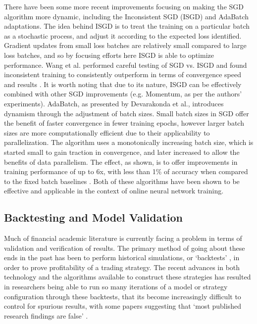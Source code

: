 \documentclass[a4paper,11pt,oneside]{article}
\theoremstyle{plain}
\theoremstyle{definition}
\begin{document}
There have been some more recent improvements focusing on making the SGD algorithm more dynamic, 
including the Inconsistent SGD (ISGD) and AdaBatch adaptations. The idea behind ISGD is to treat the training 
on a particular batch as a stochastic process, and adjust it according to the expected loss identified. Gradient 
updates from small loss batches are relatively small compared to large loss batches, and so by focusing efforts 
here ISGD is able to optimize performance. Wang et al. performed careful testing of SGD vs. ISGD and found 
inconsistent training to consistently outperform in terms of convergence speed and results \cite{Wang}. It is worth 
noting that due to its nature, ISGD can be effectively combined with other SGD improvements (e.g. Momentum, 
as per the authors’ experiments). AdaBatch, as presented by Devarakonda et al., introduces dynamism through 
the adjustment of batch sizes. Small batch sizes in SGD offer the benefit of faster convergence in fewer training 
epochs, however larger batch sizes are more computationally efficient due to their applicability to parallelization. 
The algorithm uses a monotonically increasing batch size, which is started small to gain traction in convergence, 
and later increased to allow the benefits of data parallelism. The effect, as shown, is to offer improvements in 
training performance of up to 6x, with less than 1\% of accuracy when compared to the fixed batch baselines \cite{Devarakonda}. 
Both of these algorithms have been shown to be effective and applicable in the context of online neural network training.
\hfill\break

\subsection{Backtesting and Model Validation} \label{lr_backtesting}
\hfill

Much of financial academic literature is currently facing a problem in terms of validation and verification of results. 
The primary method of going about these ends in the past has been to perform historical simulations, or ‘backtests’ ,
in order to prove profitability of a trading strategy. The recent advances in both technology and the algorithms available 
to construct these strategies has resulted in researchers being able to run so many iterations of a model or strategy
 configuration through these backtests, that its become increasingly difficult to control for spurious results, with some 
 papers suggesting that ‘most published research findings are false’   \cite{Ioannidis}.
\hfill \break 
\end{document}
